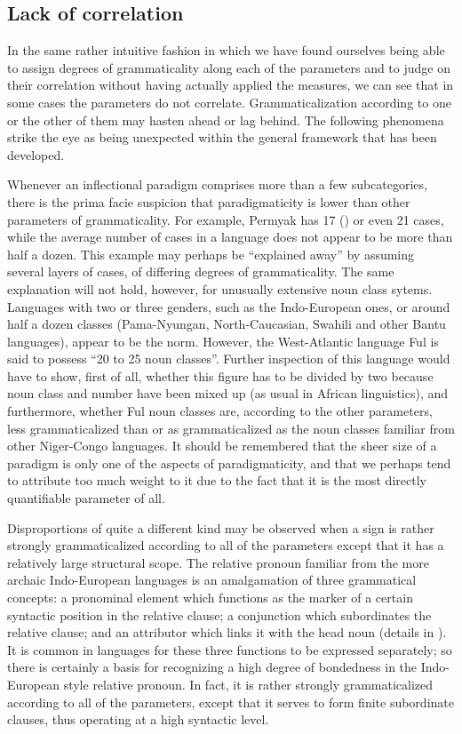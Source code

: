 \subsection{Lack of correlation} \label{sec:4.4.3}

In the same rather intuitive fashion in which we have found ourselves being able to assign degrees of grammaticality along each of the parameters and to judge on their correlation without having actually applied the measures, we can see that in some cases the parameters do not correlate. Grammaticalization according to one or the other of them may hasten ahead or lag behind. The following phenomena strike the eye as being unexpected within the general framework that has been developed.

Whenever an inflectional paradigm comprises more than a few subcategories, there is the prima facie suspicion that paradigmaticity is lower than other parameters of grammaticality. For example, Permyak has 17 (\citealt[119]{Comrie1981a}) or even 21 \citep[238]{Austerlitz1980} cases, while the average number of cases in a language does not appear to be more than half a dozen. This example may perhaps be “explained away” by assuming several layers of cases, of differing degrees of grammaticality. The same explanation will not hold, however, for unusually extensive noun class sytems. Languages with two or three genders, such as the Indo-European ones, or around half a dozen classes (Pama-Nyungan, North-Caucasian, Swahili and other Bantu languages), appear to be the norm. However, the West-Atlantic language Ful is said \citep[51]{HeineEtAl1981} to possess “20 to 25 noun classes”. Further inspection of this language would have to show, first of all, whether this figure has to be divided by two because noun class and number have been mixed up (as usual in African linguistics), and furthermore, whether Ful noun classes are, according to the other parameters, less grammaticalized than or as grammaticalized as the noun classes familiar from other Niger-Congo languages. It should be remembered that the sheer size of a paradigm is only one of the aspects of paradigmaticity, and that we perhaps tend to attribute too much weight to it due to the fact that it is the most directly quantifiable parameter of all.

Disproportions of quite a different kind may be observed when a sign is rather strongly grammaticalized according to all of the parameters except that it has a relatively large structural scope. The relative pronoun familiar from the more archaic Indo-European languages is an amalgamation of three grammatical concepts: a pronominal element which functions as the marker of a certain syntactic position in the relative clause; a conjunction which subordinates the relative clause; and an attributor which links it with the head noun (details in \citealt[Ch.~IV.4]{Lehmann1984}). It is common in languages for these three functions to be expressed separately; so there is certainly a basis for recognizing a high degree of bondedness in the Indo-European style relative pronoun. In fact, it is rather strongly grammaticalized according to all of the parameters, except that it serves to form finite subordinate clauses, thus operating at a high syntactic level.

